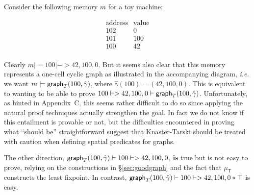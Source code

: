 Consider the following memory $m$ for a toy machine:

\begin{minipage}{.24\textwidth}
\qquad \[
\begin{array}{l|l}
\textrm{address} & \textrm{value} \\
\hline
102 & 0 \\
101 & 100 \\
100 & 42 \\
\end{array}
\]
\end{minipage}
\begin{minipage}{.19\textwidth}
\centering
{}
\endpgfgraphicnamed
\end{minipage}
\vspace{0.75ex}

\noindent Clearly $m |= 100 |-> 42,100,0$.  But it seems also clear that this memory represents a one-cell cyclic graph as illustrated in the accompanying diagram, \emph{i.e.} we want $m |= \mathsf{graph}_T(100,\hat{\gamma})$, where $\hat{\gamma}(100) = (42,100,0)$.  This is equivalent to wanting to be able to prove $100 |-> 42,100,0 |- \mathsf{graph}_T(100,\hat{\gamma})$.  Unfortunately, as hinted in Appendix~C\hide{\ref{apx:problemrecgraph}}, this seems rather difficult to do so since applying the natural proof techniques actually strengthen the goal.  In fact we do not know if this entailment is provable or not, but the difficulties encountered in proving what ``should be'' straightforward suggest that Knaster-Tarski should be treated with caution when defining spatial predicates for graphs.

The other direction, \mbox{$\mathsf{graph}_T(100,\hat{\gamma}) |- 100 |-> 42,100,0$},
\textbf{is} true but is not easy to prove, relying on the constructions in \S\ref{sec:goodgraph} and the fact that $\mu_{\mathsf{T}}$ constructs the least fixpoint.  In contrast, $\mathsf{graph}_T(100,\hat{\gamma}) |- 100 |-> 42,100,0 * \top$ is easy. %


